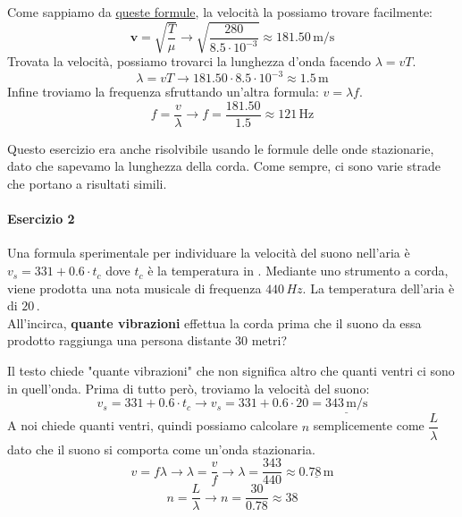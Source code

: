 Come sappiamo da \hyperref[subsec:onde:sper]{queste formule}, la velocità la possiamo trovare
facilmente:
\begin{equation*}
\boldsymbol{v} = 
\sqrt{\frac{T}{\mu}} \rightarrow \sqrt{\frac{280}{8.5\cdot 10^{-3}}} \approx\boxed{181.50\,\text{m/s}}
\end{equation*}
Trovata la velocità, possiamo trovarci la lunghezza d'onda facendo $\lambda = vT$.
\begin{equation*}
\lambda = vT \rightarrow 181.50\cdot 8.5\cdot10^{-3} \approx\boxed{1.5\,\text{m}}
\end{equation*}
Infine troviamo la frequenza sfruttando un'altra formula: $v = \lambda f$.
\begin{equation*}
f = \frac{v}{\lambda} \rightarrow f = \frac{181.50}{1.5} \approx\boxed{121\, \text{Hz}}
\end{equation*}

Questo esercizio era anche risolvibile usando le formule delle onde stazionarie, dato che sapevamo
la lunghezza della corda. Come sempre, ci sono varie strade che portano a risultati simili.

\paragraph{Esercizio 2}
Una formula sperimentale per individuare la velocità del suono nell'aria è $v_s = 331 +0.6\cdot t_c$
dove $t_c$ è la temperatura in \textcelsius. Mediante uno strumento a corda, viene prodotta una 
nota musicale di frequenza $440\,Hz$. La temperatura dell'aria è di $20\,$\textcelsius.\\
All'incirca, \textbf{quante vibrazioni} effettua la corda prima che il suono da essa prodotto 
raggiunga una persona distante 30 metri?
\divisor

Il testo chiede "quante vibrazioni" che non significa altro che quanti ventri ci sono in quell'onda.
Prima di tutto però, troviamo la velocità del suono:
\begin{equation*}
v_s = 331 + 0.6\cdot t_c \rightarrow v_s = 331+0.6\cdot20 = \underline{343\,\text{m/s}}
\end{equation*}
A noi chiede quanti ventri, quindi possiamo calcolare $n$ semplicemente come $\dfrac{L}{\lambda}$
dato che il suono si comporta come un'onda stazionaria.
\begin{equation*}
v = f\lambda \rightarrow \lambda = \frac{v}{f} \rightarrow \lambda = \frac{343}{440} \approx 
\underline{0.78\,\text{m}}
\end{equation*}
\begin{equation*}
n = \frac{L}{\lambda} \rightarrow n = \frac{30}{0.78} \approx\boxed{38}
\end{equation*}


